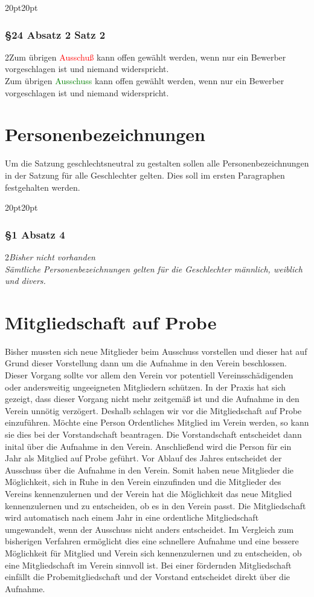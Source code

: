 \documentclass[10pt,a4paper,parskip=half]{scrartcl}
\newcommand{\new}[1]{\textcolor{Green}{#1}}
\newcommand{\old}[1]{\textcolor{Red}{#1}}
\newcommand{\change}[1]{
  \begin{adjustwidth}{20pt}{20pt}
    #1
  \end{adjustwidth}
}
\newcommand{\compare}[3]{\change{\subsubsection*{#1}\begin{multicols}{2}#2\columnbreak\\#3\end{multicols}}}
\begin{document}
\compare{§24 Absatz 2 Satz 2}
{Zum übrigen \old{Ausschuß} kann offen gewählt werden, wenn nur ein Bewerber vorgeschlagen ist und niemand widerspricht.}
{Zum übrigen \new{Ausschuss} kann offen gewählt werden, wenn nur ein Bewerber vorgeschlagen ist und niemand widerspricht.}
\clearpage
\section{Personenbezeichnungen}
Um die Satzung geschlechtsneutral zu gestalten sollen alle Personenbezeichnungen in der Satzung für alle Geschlechter gelten. Dies soll im ersten Paragraphen festgehalten werden.

\compare{§1 Absatz 4}{\em Bisher nicht vorhanden \em}{Sämtliche Personenbezeichnungen gelten für die Geschlechter männlich, weiblich und divers.}

\clearpage
\section{Mitgliedschaft auf Probe}
Bisher mussten sich neue Mitglieder beim Ausschuss vorstellen und dieser hat auf Grund dieser Vorstellung dann um die Aufnahme in den Verein beschlossen. Dieser Vorgang sollte vor allem den Verein vor potentiell Vereinsschädigenden oder andersweitig ungeeigneten Mitgliedern schützen. In der Praxis hat sich gezeigt, dass dieser Vorgang nicht mehr zeitgemäß ist und die Aufnahme in den Verein unnötig verzögert. Deshalb schlagen wir vor die Mitgliedschaft auf Probe einzuführen. Möchte eine Person Ordentliches Mitglied im Verein werden, so kann sie dies bei der Vorstandschaft beantragen. Die Vorstandschaft entscheidet dann inital über die Aufnahme in den Verein. Anschließend wird die Person für ein Jahr als Mitglied auf Probe geführt. Vor Ablauf des Jahres entscheidet der Ausschuss über die Aufnahme in den Verein. Somit haben neue Mitglieder die Möglichkeit, sich in Ruhe in den Verein einzufinden und die Mitglieder des Vereins kennenzulernen und der Verein hat die Möglichkeit das neue Mitglied kennenzulernen und zu entscheiden, ob es in den Verein passt. Die Mitgliedschaft wird automatisch nach einem Jahr in eine ordentliche Mitgliedschaft umgewandelt, wenn der Ausschuss nicht anders entscheidet. Im Vergleich zum bisherigen Verfahren ermöglicht dies eine schnellere Aufnahme und eine bessere Möglichkeit für Mitglied und Verein sich kennenzulernen und zu entscheiden, ob eine Mitgliedschaft im Verein sinnvoll ist. Bei einer fördernden Mitgliedschaft einfällt die Probemitgliedschaft und der Vorstand entscheidet direkt über die Aufnahme.
\end{document}
